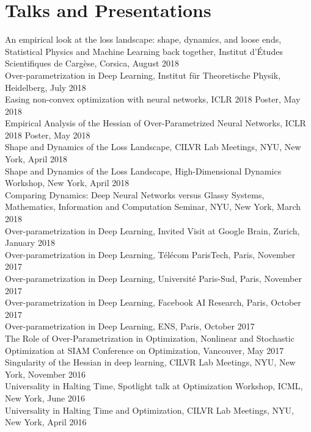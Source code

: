 \documentclass[10pt,letterpaper]{article}
\renewenvironment{itemize}
{
\begin{list}{}{\setlength{\leftmargin}{1.5em}}
}
{
  \end{list}
}
\begin{document}
\section*{Talks and Presentations}
\begin{itemize}
\item An empirical look at the loss landscape: shape, dynamics, and loose ends, Statistical Physics and Machine Learning back together, Institut d'\'Etudes Scientifiques de Carg\`ese, Corsica, August 2018 \\
Over-parametrization in Deep Learning, Institut f\"ur Theoretische Physik, Heidelberg, July 2018 \\
Easing non-convex optimization with neural networks, ICLR 2018 Poster, May 2018 \\
Empirical Analysis of the Hessian of Over-Parametrized Neural Networks, ICLR 2018 Poster, May 2018 \\
Shape and Dynamics of the Loss Landscape, CILVR Lab Meetings, NYU, New York, April 2018 \\
Shape and Dynamics of the Loss Landscape, High-Dimensional Dynamics Workshop, New York, April 2018 \\
Comparing Dynamics: Deep Neural Networks versus Glassy Systems, Mathematics, Information and Computation Seminar, NYU, New York, March 2018 \\ 
Over-parametrization in Deep Learning, Invited Visit at Google Brain, Zurich, January 2018 \\ 
Over-parametrization in Deep Learning, T\'el\'ecom ParisTech, Paris, November 2017 \\ 
Over-parametrization in Deep Learning, Universit\'e Paris-Sud, Paris, November 2017 \\ 
Over-parametrization in Deep Learning, Facebook AI Research, Paris, October 2017 \\ 
Over-parametrization in Deep Learning, ENS, Paris, October 2017 \\ 
The Role of Over-Parametrization in Optimization, Nonlinear and Stochastic Optimization at SIAM Conference on Optimization, Vancouver, May 2017 \\ 
Singularity of the Hessian in deep learning, CILVR Lab Meetings, NYU, New York, November 2016 \\ 
Universality in Halting Time, Spotlight talk at Optimization Workshop, ICML, New York, June 2016 \\ 
Universality in Halting Time and Optimization, CILVR Lab Meetings, NYU, New York, April 2016 \\ 

\end{itemize}
\end{document}
